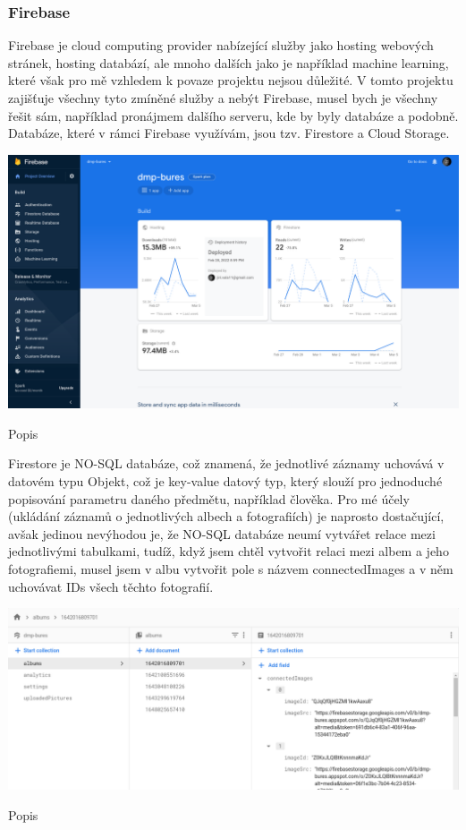 \documentclass[12pt,a4paper]{report}
\begin{document}
  \subsubsection{Firebase}
  Firebase je cloud computing provider nabízející služby jako hosting webových stránek, hosting
  databází, ale mnoho dalších jako je například machine learning, které však pro mě vzhledem k
  povaze projektu nejsou důležité. V tomto projektu zajišťuje všechny tyto zmíněné služby a nebýt
  Firebase, musel bych je všechny řešit sám, například pronájmem dalšího serveru, kde by byly
  databáze a podobně.
  Databáze, které v rámci Firebase využívám, jsou tzv. Firestore a Cloud Storage.

  \vspace*{0.5cm}
  \noindent\includegraphics[width=\linewidth]{firebaseDash.png}
  \begin{center}
    Popis
  \end{center}
  \vspace*{0.5cm}
  Firestore je NO-SQL databáze, což znamená, že jednotlivé záznamy uchovává v datovém typu
  Objekt, což je key-value datový typ, který slouží pro jednoduché popisování parametru daného
  předmětu, například člověka. Pro mé účely (ukládání záznamů o jednotlivých albech a fotografiích)
  je naprosto dostačující, avšak jedinou nevýhodou je, že NO-SQL databáze neumí vytvářet relace
  mezi jednotlivými tabulkami, tudíž, když jsem chtěl vytvořit relaci mezi albem a jeho fotografiemi,
  musel jsem v albu vytvořit pole s názvem connectedImages a v něm uchovávat IDs všech těchto
  fotografií.

  \vspace*{0.5cm}
  \noindent\includegraphics[width=\linewidth]{firestore.png}
  \begin{center}
    Popis
  \end{center}
  \vspace*{0.5cm}
\end{document}
